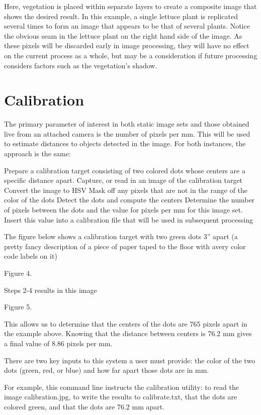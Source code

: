 \documentclass[letterpaper]{article}
\begin{document}
Here, vegetation is placed within separate layers to create a composite image that shows the desired result. In this example, a single lettuce plant is replicated several times to form an image that appears to be that of several plants. Notice the obvious seam in the lettuce plant on the  right hand side of the image. As these pixels will be discarded early in image processing, they will have no effect on the current process as a whole, but may be a consideration if future processing considers factors such as the vegetation’s shadow.


\section{Calibration}
The primary parameter of interest in both static image sets and those obtained live from an attached camera is the number of pixels per mm. This will be used to estimate distances to objects detected in the image.  For both instances, the approach is the same:

Prepare a calibration target consisting of two colored dots whose centers are a specific distance apart.
Capture, or read in an image of the calibration target
Convert the image to HSV
Mask off any pixels that are not in the range of the color of the dots
Detect the dots and compute the centers
Determine the number of pixels between the dots and the value for pixels per mm for this image set.
Insert this value into a calibration file that will be used in subsequent processing

The figure below shows a calibration target with two green dots 3” apart (a pretty fancy description of a piece of paper taped to the floor with avery color code labels on it)

Figure 4. 

Steps 2-4 results in this image


Figure 5. 

This allows us to determine that the centers of the dots are 765 pixels apart in the example above. Knowing that the distance between centers is 76.2 mm gives a final value of 8.86 pixels per mm.

There are two key inputs to this system a user must provide: the color of the two dots (green, red, or blue) and how far apart those dots are in mm.

For example, this command line instructs the calibration utility: 
to read the image calibration.jpg, 
to write the results to calibrate.txt, 
that the dots are colored green, and 
that the dots are 76.2 mm apart.
\end{document}
